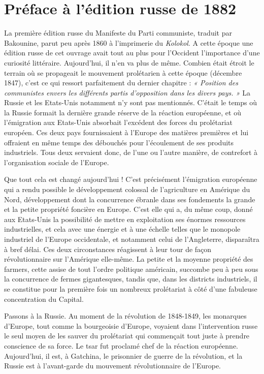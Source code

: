 \documentclass[french,twoside]{book} %
\begin{document}
\section[Préface à l’édition russe de 1882]{Préface à l’édition russe de 1882}
\noindent La première édition russe du Manifeste du Parti communiste, traduit par Bakounine, parut peu après 1860 à l’imprimerie du \emph{Kolokol}. A cette époque une édition russe de cet ouvrage avait tout au plus pour l’Occident l’importance d’une curiosité littéraire. Aujourd’hui, il n’en va plus de même. Combien était étroit le terrain où se propageait le mouvement prolétarien à cette époque (décembre 1847), c’est ce qui ressort parfaitement du dernier chapitre : \emph{« Position des communistes envers les différents partis d’opposition dans les divers pays. »} La Russie et les Etats-Unis notamment n’y sont pas mentionnés. C'était le temps où la Russie formait la dernière grande réserve de la réaction européenne, et où l’émigration aux Etats-Unis absorbait l’excédent des forces du prolétariat européen. Ces deux pays fournissaient à l’Europe des matières premières et lui offraient en même temps des débouchés pour l’écoulement de ses produits industriels. Tous deux servaient donc, de l’une ou l’autre manière, de contrefort à l’organisation sociale de l’Europe.\par
Que tout cela est changé aujourd’hui ! C'est précisément l’émigration européenne qui a rendu possible le développement colossal de l’agriculture en Amérique du Nord, développement dont la concurrence ébranle dans ses fondements la grande et la petite propriété foncière en Europe. C'est elle qui a, du même coup, donné aux Etats-Unis la possibilité de mettre en exploitation ses énormes ressources industrielles, et cela avec une énergie et à une échelle telles que le monopole industriel de l’Europe occidentale, et notamment celui de l’Angleterre, disparaîtra à bref délai. Ces deux circonstances réagissent à leur tour de façon révolutionnaire sur l’Amérique elle-même. La petite et la moyenne propriété des farmers, cette assise de tout l’ordre politique américain, succombe peu à peu sous la concurrence de fermes gigantesques, tandis que, dans les districts industriels, il se constitue pour la première fois un nombreux prolétariat à côté d’une fabuleuse concentration du Capital.\par
Passons à la Russie. Au moment de la révolution de 1848-1849, les monarques d’Europe, tout comme la bourgeoisie d’Europe, voyaient dans l’intervention russe le seul moyen de les sauver du prolétariat qui commençait tout juste à prendre conscience de sa force. Le tsar fut proclamé chef de la réaction européenne. Aujourd’hui, il est, à Gatchina, le prisonnier de guerre de la révolution, et la Russie est à l’avant-garde du mouvement révolutionnaire de l’Europe.\par
\end{document}
